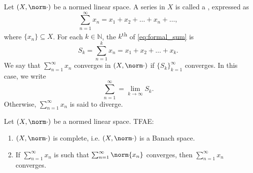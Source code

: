 \documentclass[notoc,notitlepage]{tufte-book}
\begin{document}
\begin{defn}\label{defn:formal_sum}
  Let $(X, \norm\cdot)$ be a normed linear space. A series in $X$ is called a , expressed as
  \begin{equation}\label{eq:formal_sum}
    \sum_{n=1}^{\infty} x_n = x_1 + x_2 + \hdots + x_n + \hdots ,
  \end{equation}
  where $\{ x_n \} \subseteq X$. For each $k \in \mathbb{N}$, the $k$\textsuperscript{th}  of \cref{eq:formal_sum} is
  \begin{equation*}
    S_k = \sum_{n=1}^{k} x_n = x_1 + x_2 + \hdots + x_k.
  \end{equation*}
  We say that $\sum_{n=1}^{\infty} x_n$ converges in $(X, \norm\cdot)$ if $\{ S_k \}_{k = 1}^{\infty}$ converges. In this case, we write
  \begin{equation*}
    \sum_{n=1}^{\infty} = \lim_{k \to \infty} S_k.
  \end{equation*}
  Otherwise, $\sum_{n=1}^{\infty} x_n$ is said to diverge.
\end{defn}

\begin{thm}\label{thm:weierstrass_m_test}
  Let $(X, \norm\cdot)$ be a normed linear space. TFAE:
  \begin{enumerate}
    \item $(X, \norm\cdot)$ is complete, i.e. $(X, \norm\cdot)$ is a Banach space.
    \item If $\sum_{n=1}^{\infty} x_n$ is such that $\sum_{n=1}^{\infty} \norm{x_n}$ converges, then $\sum_{n=1}^{\infty} x_n$ converges.
  \end{enumerate}
\end{thm}
\end{document}
